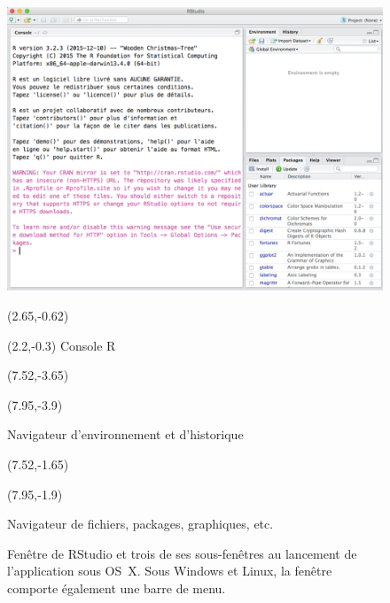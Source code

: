 \begin{figure}[t]
  \includegraphics{rstudiowindow-screenshot}
  \vspace{0.5\TPVertModule}

  \begin{textblock}{0.5}(2.65,-0.62)
    \large\faLongArrowDown
  \end{textblock}
  \begin{textblock}{2}(2.2,-0.3)
    \footnotesize\sffamily Console R
  \end{textblock}

  \begin{textblock}{1}(7.52,-3.65)
    \large\faLongArrowRight
  \end{textblock}
  \begin{textblock}{2.2}(7.95,-3.9)
    \footnotesize\sffamily\raggedright Navigateur d'environnement et d'historique
  \end{textblock}

  \begin{textblock}{1}(7.52,-1.65)
    \large\faLongArrowRight
  \end{textblock}
  \begin{textblock}{2.2}(7.95,-1.9)
    \footnotesize\sffamily\raggedright Navigateur de fichiers, packages, graphiques, etc.
  \end{textblock}
  \caption{Fenêtre de RStudio et trois de ses sous-fenêtres au
    lancement de l'application sous OS~X. Sous Windows et Linux, la
    fenêtre comporte également une barre de menu.}
  \label{fig:rstudio:rstudiowindow}
\end{figure}

